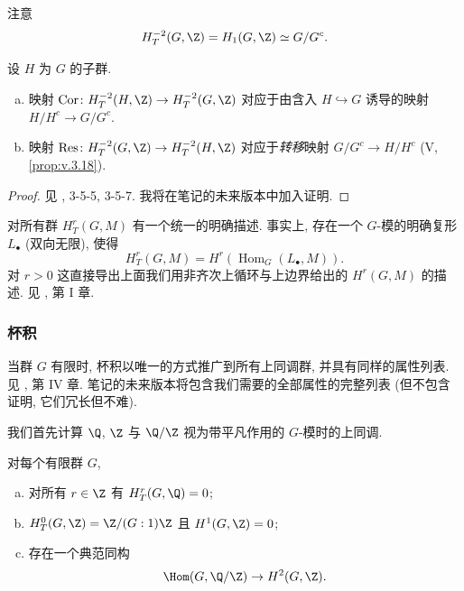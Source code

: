 注意
\[
 H_T^{-2}(G,\Z)=H_1(G,\Z)\simeq G/G^c.
\]

\begin{proposition}\label{prop:ii.3.2}
设 $H$ 为 $G$ 的子群.
\begin{enumerate}[(a)]
\item 映射 $\Cor\colon H_T^{-2}(H,\Z)\to H_T^{-2}(G,\Z)$ 对应于由含入 $H\hookrightarrow G$ 诱导的映射 $H/H^c\to G/G^c$.
\item 映射 $\Res\colon H_T^{-2}(G,\Z)\to H_T^{-2}(H,\Z)$ 对应于\emph{转移}映射 $G/G^c\to H/H^c$ (V, \ref{prop:v.3.18}).
\end{enumerate}
\end{proposition}

\begin{proof}
见 \cite{Weiss1969}, 3-5-5, 3-5-7. 我将在笔记的未来版本中加入证明.
\end{proof}

对所有群 $H_T^r(G,M)$ 有一个统一的明确描述. 事实上, 存在一个 $G$-模的明确复形 $L_\bullet$ (双向无限), 使得
\[
 H_T^r(G,M)=H^r(\operatorname{Hom}_G(L_\bullet,M)).
\]
对 $r>0$ 这直接导出上面我们用非齐次上循环与上边界给出的 $H^r(G,M)$ 的描述. 见 \cite{Weiss1969}, 第 I 章.

\subsubsection*{杯积}

当群 $G$ 有限时, 杯积以唯一的方式推广到所有上同调群, 并具有同样的属性列表. 见 \cite{Weiss1969}, 第 IV 章. 笔记的未来版本将包含我们需要的全部属性的完整列表 (但不包含证明, 它们冗长但不难).

\bigskip

我们首先计算 $\Q$, $\Z$ 与 $\Q/\Z$ 视为带平凡作用的 $G$-模时的上同调.

\begin{lemma}\label{lem:ii.3.3}
对每个有限群 $G$,
\begin{enumerate}[(a)]
\item 对所有 $r\in\Z$ 有 $H_T^r(G,\Q)=0$;
\item $H_T^0(G,\Z)=\Z/(G:1)\Z$ 且 $H^1(G,\Z)=0$;
\item 存在一个典范同构
\[
 \Hom(G,\Q/\Z)\to H^2(G,\Z).
\]
\end{enumerate}
\end{lemma}

